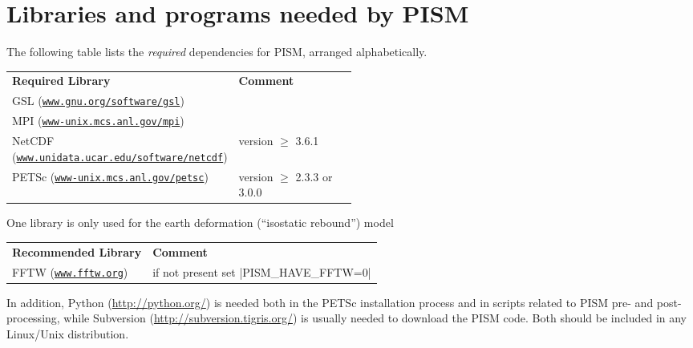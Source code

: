 \documentclass[11pt,final]{amsart}
\newcommand{\PETSCREL}{2.3.3 or 3.0.0}
\newcommand{\normalspacing}{\renewcommand{\baselinestretch}{1.1}\tiny\normalsize}
\renewcommand{\t}[1]{\texttt{#1}}
\begin{document}
\clearpage
\section{Libraries and programs needed by PISM}
\label{sec:prerequisites}

\bigskip
The following table lists the \emph{required} dependencies for PISM, arranged alphabetically.
\bigskip
\newcommand{\fattablespacing}{\renewcommand{\baselinestretch}{1.5}\tiny\normalsize}
\fattablespacing
\newcommand\pairstack[2]{#1 \quad (\small#2\normalsize)}
\begin{center}
\begin{tabular*}{1.0\linewidth}{lp{0.5\linewidth}}\hline
  \textbf{Required Library} & \textbf{Comment} \\
  \pairstack{GSL}{\href{http://www.gnu.org/software/gsl/}{\t{www.gnu.org/software/gsl}}}  &  \\
  \pairstack{MPI}{\href{http://www-unix.mcs.anl.gov/mpi/}{\t{www-unix.mcs.anl.gov/mpi}}}  & \\
  \pairstack{NetCDF}{\href{http://www.unidata.ucar.edu/software/netcdf/}{\t{www.unidata.ucar.edu/software/netcdf}}}  & version $\ge$ 3.6.1\\
  \pairstack{PETSc}{\href{http://www-unix.mcs.anl.gov/petsc/petsc-as/}{\t{www-unix.mcs.anl.gov/petsc}}}  & version $\ge$ \PETSCREL \\
  \hline
\end{tabular*}
\end{center}
\normalspacing\bigskip

\noindent One library is only used for the earth deformation (``isostatic rebound'') model
\bigskip
\fattablespacing
\begin{center}
\begin{tabular*}{1.0\linewidth}{ll}\hline
  \textbf{Recommended Library} & \textbf{Comment} \\
  \pairstack{FFTW}{\href{http://www.fftw.org/}{\t{www.fftw.org}}}\hspace{1.9in} & if not present set |PISM_HAVE_FFTW=0|\\
  \hline
\end{tabular*}
\end{center}
\normalspacing
\bigskip

\noindent In addition, Python (\url{http://python.org/}) is needed both in the PETSc installation process and in scripts related to PISM pre- and post-processing, while Subversion (\url{http://subversion.tigris.org/}) is usually needed to download the PISM code.  Both should be included in any Linux/Unix distribution.
\end{document}
